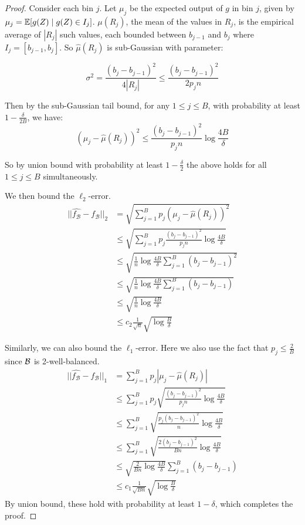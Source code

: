 \begin{proof}
Consider each bin $j$. Let $\mu_j$ be the expected output of $g$ in bin $j$, given by $\mu_j = \mathbb{E}[g(Z) \; | \; g(Z) \in I_j]$. $\mu(R_j)$, the mean of the values in $R_j$, is the empirical average of $|R_j|$ such values, each bounded between $b_{j-1}$ and $b_j$ where $I_j = [b_{j-1}, b_j]$. So $\hat{\mu}(R_j)$ is sub-Gaussian with parameter:

\[ \sigma^2 = \frac{(b_j - b_{j-1})^2}{4|R_j|} \leq \frac{(b_j - b_{j-1})^2}{2p_jn} \]

Then by the sub-Gaussian tail bound, for any $1 \leq j \leq B$, with probability at least $1 - \frac{\delta}{2B}$, we have:
\[ (\mu_j - \hat{\mu}(R_j))^2 \leq \frac{(b_j - b_{j-1})^2}{p_jn} \log{\frac{4B}{\delta}} \] 

So by union bound with probability at least $1 - \frac{\delta}{2}$ the above holds for all $1 \leq j \leq B$ simultaneously.

We then bound the $\ell_2$-error.
\begin{align*}
||\hat{f_{\mathcal{B}}} - f_{\mathcal{B}}||_2 &= \sqrt{\sum_{j =1}^B p_j (\mu_j - \hat{\mu}(R_j))^2} \\
&\leq \sqrt{\sum_{j =1}^B p_j \frac{(b_j - b_{j-1})^2}{p_jn} \log{\frac{4B}{\delta}}} \\
&\leq \sqrt{\frac{1}{n} \log{\frac{4B}{\delta}} \sum_{j =1}^B (b_j - b_{j-1})^2 } \\
&\leq \sqrt{\frac{1}{n} \log{\frac{4B}{\delta}} \sum_{j =1}^B (b_j - b_{j-1}) } \\
&\leq \sqrt{\frac{1}{n} \log{\frac{4B}{\delta}} } \\
&\leq c_2 \frac{1}{\sqrt{n}} \sqrt{\log{\frac{B}{\delta}}}
\end{align*}

Similarly, we can also bound the $\ell_1$-error. Here we also use the fact that $p_j \leq \frac{2}{B}$ since $\mathcal{B}{}$ is 2-well-balanced.
\begin{align*}
||\hat{f_{\mathcal{B}}} - f_{\mathcal{B}}||_1 &= \sum_{j =1}^B p_j |\mu_j - \hat{\mu}(R_j)| \\
&\leq \sum_{j =1}^B p_j \sqrt{\frac{(b_j - b_{j-1})^2}{p_jn} \log{\frac{4B}{\delta}}} \\
&\leq \sum_{j =1}^B \sqrt{\frac{p_j(b_j - b_{j-1})^2}{n} \log{\frac{4B}{\delta}}} \\
&\leq \sum_{j =1}^B \sqrt{\frac{2(b_j - b_{j-1})^2}{Bn} \log{\frac{4B}{\delta}}} \\
&\leq \sqrt{\frac{2}{Bn} \log{\frac{4B}{\delta}}} \sum_{j =1}^B (b_j - b_{j-1}) \\
&\leq c_1 \frac{1}{\sqrt{Bn}} \sqrt{\log{\frac{B}{\delta}}}
\end{align*}
By union bound, these hold with probability at least $1 - \delta$, which completes the proof.
\end{proof}

